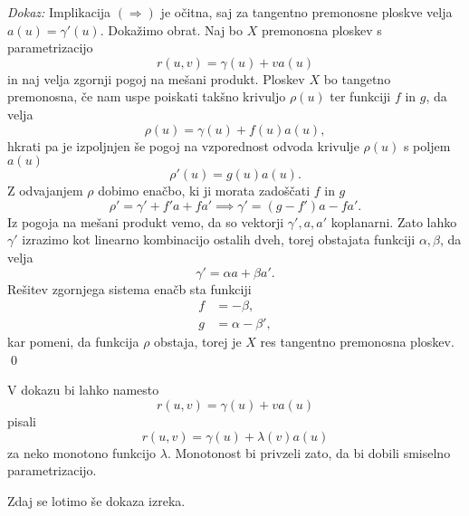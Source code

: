 \noindent
{\em Dokaz:\/}
Implikacija $(\Rightarrow)$ je očitna, saj za tangentno premonosne ploskve velja $a(u) = \gamma'(u)$. Dokažimo obrat. Naj bo $X$ premonosna ploskev s parametrizacijo \begin{equation*}
r(u,v) = \gamma(u) + v a(u)
\end{equation*} in naj velja zgornji pogoj na mešani produkt.
Ploskev $X$ bo tangetno premonosna, če nam uspe poiskati takšno krivuljo $\rho(u)$ ter funkciji $f$ in $g$, da velja 
\begin{equation*}
  \rho(u) = \gamma(u) + f(u)a(u),
  \end{equation*}hkrati pa je izpoljnjen še pogoj na vzporednost odvoda krivulje $\rho(u)$ s poljem $a(u)$ \begin{equation*}
    \rho'(u) = g(u) a(u).
    \end{equation*} 
Z odvajanjem $\rho$ dobimo enačbo, ki ji morata zadoščati $f$ in $g$ \begin{equation*}
\rho' = \gamma' + f'a + f a' \implies \gamma' = (g - f') a - fa'.
\end{equation*}  
Iz pogoja na mešani produkt vemo, da so vektorji $\gamma', a, a'$ koplanarni. Zato lahko $\gamma'$ izrazimo kot linearno kombinacijo ostalih dveh, torej
obstajata funkciji $\alpha, \beta$, da velja
\begin{equation*}
\gamma' = \alpha a + \beta a'.
\end{equation*}  
Rešitev zgornjega sistema enačb sta funkciji \begin{align*}
    f &= -\beta, \\
    g &= \alpha - \beta', 
\end{align*}
kar pomeni, da funkcija $\rho$ obstaja, torej je $X$ res tangentno premonosna ploskev.
\qed

\begin{opomba}
V dokazu bi lahko namesto \begin{equation*} r(u,v) = \gamma(u) + v a(u) \end{equation*} pisali 
\begin{equation*} r(u,v) = \gamma(u) + \lambda(v) a(u) \end{equation*} za neko monotono funkcijo $\lambda$.
Monotonost bi privzeli zato, da bi dobili smiselno parametrizacijo.
\end{opomba}

Zdaj se lotimo še dokaza izreka.

